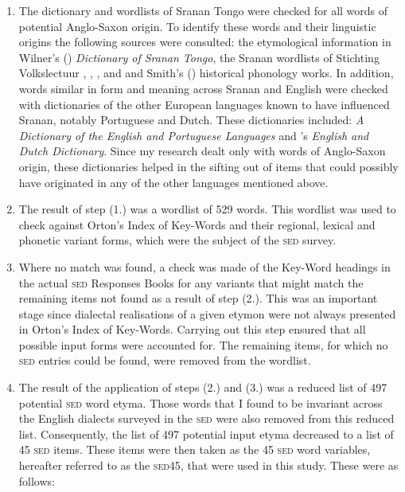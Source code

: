 \begin{enumerate}
\item{ The dictionary and wordlists of Sranan Tongo were checked for all words of potential Anglo-Saxon origin. To identify these words and their linguistic origins the following sources were consulted: the etymological information in Wilner's (\citeyear{Wilner07, Wilner03, Wilner92}) \emph{Dictionary of Sranan Tongo}, the Sranan wordlists of Stichting Volkslectuur \citep{Stichting80}, \citet{Schumann83}, \citet{Fermin69}, and \citet{Herlein18} and Smith's (\citeyear{Smith08, Smith87}) historical phonology works. In addition, words similar in form and meaning across Sranan and English were checked with dictionaries of the other European languages known to have influenced Sranan, notably Portuguese and Dutch. These dictionaries included: \citet{Vieyra60}  \emph{A Dictionary of the English and Portuguese Languages} and  \citet{Holtrop23} 's \emph{English and Dutch Dictionary}. Since my research dealt only with words of Anglo-Saxon origin, these dictionaries helped in the sifting out of items that could possibly have originated in any of the other languages mentioned above.}
\item{The result of step (1.) was a wordlist of 529 words. This wordlist was used to check against Orton's Index of Key-Words \citep{Orton62} and their regional, lexical and phonetic variant forms, which were the subject of the \textsc{sed} survey.}
\item{Where no match was found, a check was made of the Key-Word headings in the actual \textsc{sed} Responses Books \citep{Orton6271} for any variants that might match the remaining items not found as a result of step (2.). This was an important stage since dialectal realisations of a given etymon were not always presented in Orton's Index of Key-Words. Carrying out this step ensured that all possible input forms were accounted for. The remaining items, for which no \textsc{sed} entries could be found, were removed from the wordlist.}
\item{The result of the application of steps (2.) and (3.) was a reduced list of 497 potential \textsc{sed} word etyma. Those words that I found to be invariant across the English dialects surveyed in the \textsc{sed} were also removed from this reduced list. Consequently, the list of 497 potential input etyma decreased to a list of 45 \textsc{sed} items. These items were then taken as the 45 \textsc{sed} word variables, hereafter referred to as the \textsc{sed45}, that were used in this study. These were as follows:

}
\end{enumerate}
